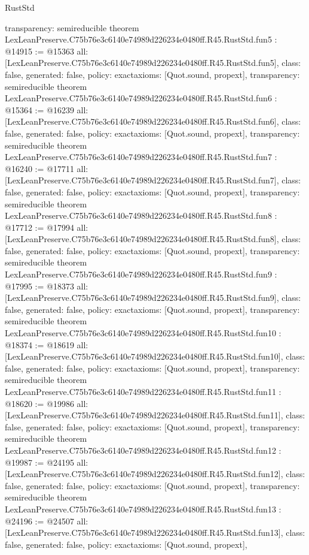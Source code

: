\begin{lexlean}{RustStd}
\begin{coremodule}
{  transparency: semireducible
}
theorem LexLeanPreserve.C75b76e3c6140e74989d226234e0480ff.R45.RustStd.fun5 : @14915 := @15363 {
  all: [LexLeanPreserve.C75b76e3c6140e74989d226234e0480ff.R45.RustStd.fun5],
  class: false,
  generated: false,
  policy: exact{axioms: [Quot.sound, propext]},
  transparency: semireducible
}
theorem LexLeanPreserve.C75b76e3c6140e74989d226234e0480ff.R45.RustStd.fun6 : @15364 := @16239 {
  all: [LexLeanPreserve.C75b76e3c6140e74989d226234e0480ff.R45.RustStd.fun6],
  class: false,
  generated: false,
  policy: exact{axioms: [Quot.sound, propext]},
  transparency: semireducible
}
theorem LexLeanPreserve.C75b76e3c6140e74989d226234e0480ff.R45.RustStd.fun7 : @16240 := @17711 {
  all: [LexLeanPreserve.C75b76e3c6140e74989d226234e0480ff.R45.RustStd.fun7],
  class: false,
  generated: false,
  policy: exact{axioms: [Quot.sound, propext]},
  transparency: semireducible
}
theorem LexLeanPreserve.C75b76e3c6140e74989d226234e0480ff.R45.RustStd.fun8 : @17712 := @17994 {
  all: [LexLeanPreserve.C75b76e3c6140e74989d226234e0480ff.R45.RustStd.fun8],
  class: false,
  generated: false,
  policy: exact{axioms: [Quot.sound, propext]},
  transparency: semireducible
}
theorem LexLeanPreserve.C75b76e3c6140e74989d226234e0480ff.R45.RustStd.fun9 : @17995 := @18373 {
  all: [LexLeanPreserve.C75b76e3c6140e74989d226234e0480ff.R45.RustStd.fun9],
  class: false,
  generated: false,
  policy: exact{axioms: [Quot.sound, propext]},
  transparency: semireducible
}
theorem LexLeanPreserve.C75b76e3c6140e74989d226234e0480ff.R45.RustStd.fun10 : @18374 := @18619 {
  all: [LexLeanPreserve.C75b76e3c6140e74989d226234e0480ff.R45.RustStd.fun10],
  class: false,
  generated: false,
  policy: exact{axioms: [Quot.sound, propext]},
  transparency: semireducible
}
theorem LexLeanPreserve.C75b76e3c6140e74989d226234e0480ff.R45.RustStd.fun11 : @18620 := @19986 {
  all: [LexLeanPreserve.C75b76e3c6140e74989d226234e0480ff.R45.RustStd.fun11],
  class: false,
  generated: false,
  policy: exact{axioms: [Quot.sound, propext]},
  transparency: semireducible
}
theorem LexLeanPreserve.C75b76e3c6140e74989d226234e0480ff.R45.RustStd.fun12 : @19987 := @24195 {
  all: [LexLeanPreserve.C75b76e3c6140e74989d226234e0480ff.R45.RustStd.fun12],
  class: false,
  generated: false,
  policy: exact{axioms: [Quot.sound, propext]},
  transparency: semireducible
}
theorem LexLeanPreserve.C75b76e3c6140e74989d226234e0480ff.R45.RustStd.fun13 : @24196 := @24507 {
  all: [LexLeanPreserve.C75b76e3c6140e74989d226234e0480ff.R45.RustStd.fun13],
  class: false,
  generated: false,
  policy: exact{axioms: [Quot.sound, propext]},
}
\end{coremodule}
\end{lexlean}
